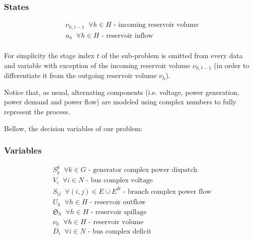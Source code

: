 \documentclass{juliacon}
\begin{document}
\subsubsection*{States}
\begin{align*}
%
& \nu_{h,t-1}  \;\; \forall h \in H \nonumber \mbox{ - incoming reservoir volume}\\
& a_{h}  \;\; \forall h \in H \nonumber \mbox{ - reservoir inflow}\\
%
\end{align*}

For simplicity the stage index $t$ of the sub-problem is omitted from every data and variable with exception of the incoming reservoir volume $\nu_{h,t-1}$ (in order to differentiate it from the outgoing reservoir volume $\nu_{h}$).

Notice that, as usual, alternating components (i.e. voltage, power generation, power demand and power flow) are modeled using complex numbers to fully represent the process.

Bellow, the decision variables of our problem:

\subsubsection*{Variables}

\begin{align*}
%
& S^g_k \;\; \forall k\in G \mbox{ - generator complex power dispatch} \\
& V_i \;\; \forall i\in N \mbox{ - bus complex voltage}\\
& S_{ij} \;\; \forall (i,j) \in E \cup E^R \mbox{ - branch complex power flow}\\
& U_h \;\; \forall h \in H \mbox{ - reservoir outflow}\\
& \mathfrak{S}_h \;\; \forall h \in H \mbox{ - reservoir spillage}\\
& \nu_h \;\; \forall h \in H \mbox{ - reservoir volume}\\
& D_i \;\; \forall i\in N \mbox{ - bus complex deficit}\\
%
\end{align*}
\end{document}
